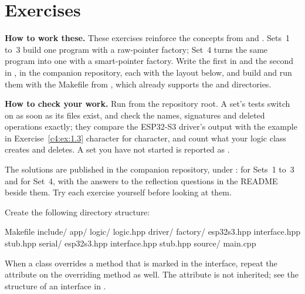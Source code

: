 
\section{Exercises}
\label{c4:sec:exercises}\label{c4:app:c}

\begin{aside}
\textbf{How to work these.} These exercises reinforce the concepts from  and
. Sets~1 to~3 build one program with a raw-pointer factory; Set~4 turns the
same program into one with a smart-pointer factory. Write the first in
 and the second in
, in the companion repository, each with the layout
below, and build and run them with the Makefile from , which already supports
the  and  directories.

\textbf{How to check your work.} Run  from the repository root. A set's tests
switch on as soon as its files exist, and check the names, signatures and deleted operations
exactly; they compare the ESP32-S3 driver's output with the example in
Exercise~\ref{c4:ex:1.3} character for character, and count what your logic class creates and
deletes. A set you have not started is reported as .

The solutions are published in the companion repository, under
:  for Sets~1 to~3 and 
for Set~4, with the answers to the reflection questions in the README beside them. Try each exercise
yourself before looking at them.
\end{aside}

Create the following directory structure:

\begin{console}
Makefile
include/
    app/
        logic/
            logic.hpp
    driver/
        factory/
            esp32s3.hpp
            interface.hpp
            stub.hpp
        serial/
            esp32s3.hpp
            interface.hpp
            stub.hpp
source/
    main.cpp
\end{console}

\note When a class overrides a method that is marked \code{[[nodiscard]]} in the interface, repeat
the attribute on the overriding method as well. The attribute is not inherited; see the structure
of an interface in .

